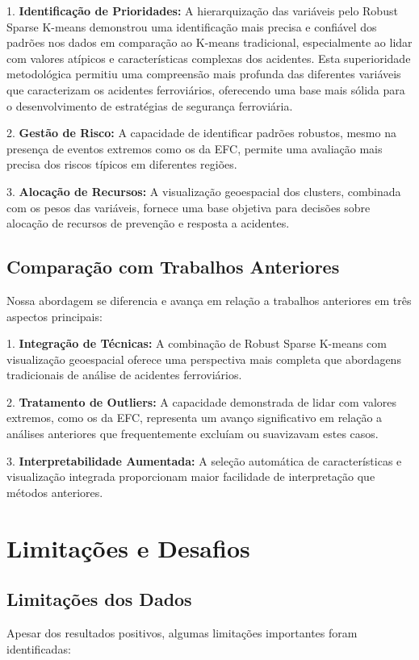 \documentclass[conference]{IEEEtran}
\begin{document}
1. \textbf{Identificação de Prioridades:} A hierarquização das variáveis pelo Robust Sparse K-means demonstrou uma identificação mais precisa e confiável dos padrões nos dados em comparação ao K-means tradicional, especialmente ao lidar com valores atípicos e características complexas dos acidentes. Esta superioridade metodológica permitiu uma compreensão mais profunda das diferentes variáveis que caracterizam os acidentes ferroviários, oferecendo uma base mais sólida para o desenvolvimento de estratégias de segurança ferroviária.

2. \textbf{Gestão de Risco:} A capacidade de identificar padrões robustos, mesmo na presença de eventos extremos como os da EFC, permite uma avaliação mais precisa dos riscos típicos em diferentes regiões.

3. \textbf{Alocação de Recursos:} A visualização geoespacial dos clusters, combinada com os pesos das variáveis, fornece uma base objetiva para decisões sobre alocação de recursos de prevenção e resposta a acidentes.

\subsection{Comparação com Trabalhos Anteriores}
Nossa abordagem se diferencia e avança em relação a trabalhos anteriores em três aspectos principais:

1. \textbf{Integração de Técnicas:} A combinação de Robust Sparse K-means com visualização geoespacial oferece uma perspectiva mais completa que abordagens tradicionais de análise de acidentes ferroviários.

2. \textbf{Tratamento de Outliers:} A capacidade demonstrada de lidar com valores extremos, como os da EFC, representa um avanço significativo em relação a análises anteriores que frequentemente excluíam ou suavizavam estes casos.

3. \textbf{Interpretabilidade Aumentada:} A seleção automática de características e visualização integrada proporcionam maior facilidade de interpretação que métodos anteriores.

\section{Limitações e Desafios}

\subsection{Limitações dos Dados}
Apesar dos resultados positivos, algumas limitações importantes foram identificadas:
\end{document}
